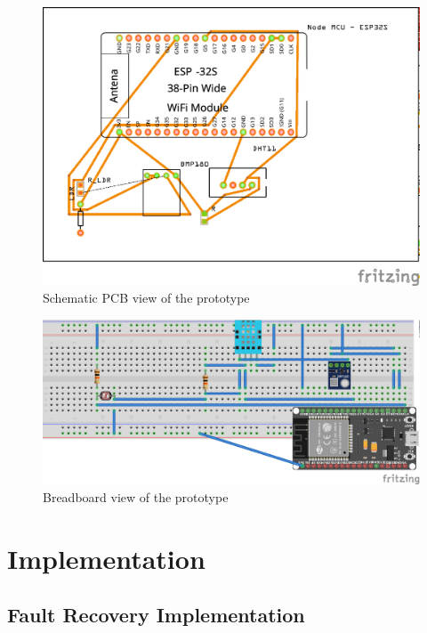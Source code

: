 \documentclass[12pt,a4paper]{article}
\begin{document}
\begin{figure}[H]
    \centering
    \includegraphics[width=\textwidth]{./images/schematic_pcb.png}
    \caption{Schematic PCB view of the prototype}
\end{figure}

\begin{figure}[H]
    \centering
    \includegraphics[width=\textwidth]{./images/breadboard.png}
    \caption{Breadboard view of the prototype}
\end{figure}

\newpage


\section{Implementation}

\subsection{Fault Recovery Implementation}
\end{document}

